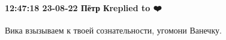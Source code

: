  
 
 
 
 

\paragraph{12:47:18 23-08-22 Пётр Кreplied to ❤️}

Вика взызываем к твоей сознательности, угомони Ванечку.

